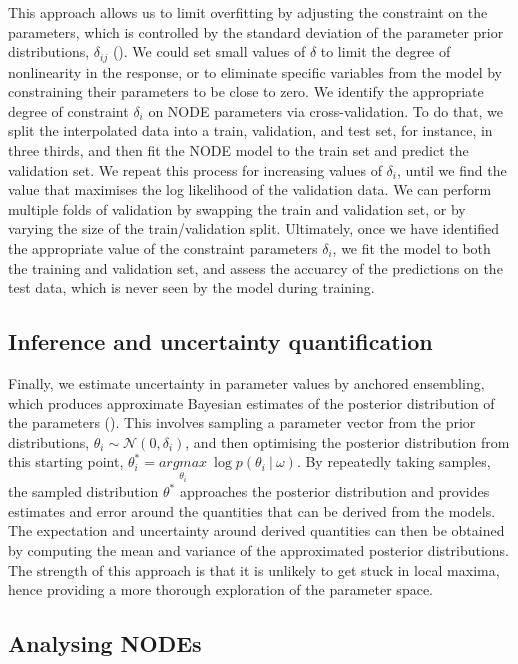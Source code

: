 \documentclass[11pt, oneside]{article}
\begin{document}
This approach allows us to limit overfitting by adjusting the constraint on the parameters, which is controlled by the standard deviation of the parameter prior distributions, $\delta_{ij}$ (\cite{Cawley2007, Bonnaffe2021a}).
We could set small values of $\delta$ to limit the degree of nonlinearity in the response, or to eliminate specific variables from the model by constraining their parameters to be close to zero.
We identify the appropriate degree of constraint $\delta_{i}$ on NODE parameters via cross-validation. 
To do that, we split the interpolated data into a train, validation, and test set, for instance, in three thirds, and then fit the NODE model to the train set and predict the validation set.
We repeat this process for increasing values of $\delta_{i}$, until we find the value that maximises the log likelihood of the validation data.
We can perform multiple folds of validation by swapping the train and validation set, or by varying the size of the train/validation split.
Ultimately, once we have identified the appropriate value of the constraint parameters $\delta_{i}$, we fit the model to both the training and validation set, and assess the accuarcy of the predictions on the test data, which is never seen by the model during training.

\subsection{Inference and uncertainty quantification}

Finally, we estimate uncertainty in parameter values by anchored ensembling, which produces approximate Bayesian estimates of the posterior distribution of the parameters (\cite{Pearce2018}).
This involves sampling a parameter vector from the prior distributions, $\theta_{i} \sim \mathcal{N}(0,\delta_{i})$, and then optimising the posterior distribution from this starting point, $\theta^*_i = \underset{\theta_i}{argmax}~\log p(\theta_i~|~\omega)$.
By repeatedly taking samples, the sampled distribution $\theta^*$ approaches the posterior distribution and provides estimates and error around the quantities that can be derived from the models.
The expectation and uncertainty around derived quantities can then be obtained by computing the mean and variance of the approximated posterior distributions.
The strength of this approach is that it is unlikely to get stuck in local maxima, hence providing a more thorough exploration of the parameter space.

\subsection{Analysing NODEs}
\end{document}
